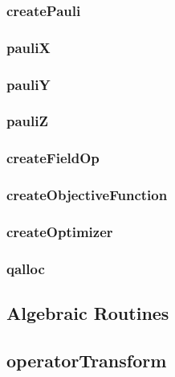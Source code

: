 \documentclass[10pt]{book}
\begin{document}
\subsubsection{\textbf{createPauli}}\label{subsec:createpauli}


\subsubsection{\textbf{pauliX}}\label{subsec:paulix}


\subsubsection{\textbf{pauliY}}\label{subsec:pauliy}


\subsubsection{\textbf{pauliZ}}\label{subsec:pauliz}


\subsubsection{\textbf{createFieldOp}}\label{subsec:createfieldop}


\subsubsection{\textbf{createObjectiveFunction}}\label{subsec:createobjfunc}


\subsubsection{\textbf{createOptimizer}}\label{subsec:createoptimizer}


\subsubsection{\textbf{qalloc}}\label{subsec:qalloc}



\subsection{Algebraic Routines}
\subsection{\textbf{operatorTransform}}\label{subsec:operatortransform}

\end{document}
